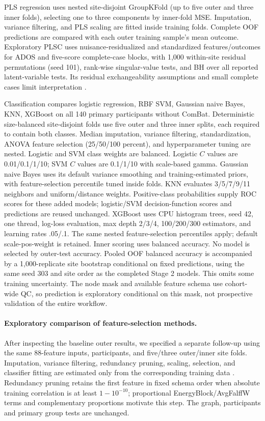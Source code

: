 \documentclass[10pt,letterpaper]{article}
\begin{document}
PLS regression uses nested site-disjoint GroupKFold (up to five outer and three
inner folds), selecting one to three components by inner-fold MSE. Imputation,
variance filtering, and PLS scaling are fitted inside training folds. Complete
OOF predictions are compared with each outer training sample's mean outcome.
Exploratory PLSC uses nuisance-residualized and standardized features/outcomes for
ADOS and five-score complete-case blocks, with 1,000 within-site residual
permutations (seed 101), rank-wise singular-value tests, and BH over all reported
latent-variable tests. Its residual exchangeability assumptions and small complete
cases limit interpretation \cite{Krishnan2011}.

Classification compares logistic regression, RBF SVM, Gaussian naive Bayes, KNN, XGBoost on all 140 primary
participants without ComBat. Deterministic size-balanced site-disjoint folds use
five outer and three inner splits, each required to contain both classes.
Median imputation, variance filtering, standardization, ANOVA feature selection
(25/50/100 percent), and hyperparameter tuning are nested. Logistic and SVM
class weights are balanced. Logistic $C$ values are 0.01/0.1/1/10; SVM $C$ values
are 0.1/1/10 with scale-based gamma. Gaussian naive Bayes uses its default
variance smoothing and training-estimated priors, with feature-selection percentile
tuned inside folds. KNN evaluates 3/5/7/9/11 neighbors and uniform/distance
weights. Positive-class probabilities supply ROC scores for these added models;
logistic/SVM decision-function scores and predictions are reused unchanged.
XGBoost uses CPU histogram trees, seed 42, one thread, log-loss evaluation,
max depth 2/3/4, 100/200/300 estimators, and learning rates .05/.1. The same
nested feature-selection percentiles apply; default scale-pos-weight is retained.
Inner scoring uses balanced accuracy. No model is selected by outer-test accuracy.
Pooled OOF balanced accuracy is accompanied by a 1,000-replicate site bootstrap
conditional on fixed predictions, using the same seed 303 and site order as the
completed Stage 2 models. This omits some training uncertainty. The node mask and
available feature schema use cohort-wide QC, so prediction is exploratory
conditional on this mask, not prospective validation of the entire workflow.

\paragraph*{Exploratory comparison of feature-selection methods.}
After inspecting the baseline outer results, we specified a separate follow-up
using the same 88-feature inputs, participants, and five/three outer/inner site
folds. Imputation, variance filtering, redundancy pruning, scaling, selection,
and classifier fitting are estimated only from the corresponding training data
\cite{scikit-learn}. Redundancy pruning retains the first feature in fixed schema
order when absolute training correlation is at least $1-10^{-10}$; proportional
EnergyBlock/AvgFalffW terms and complementary proportions motivate this step.
The graph, participants and primary group tests are unchanged.
\end{document}
